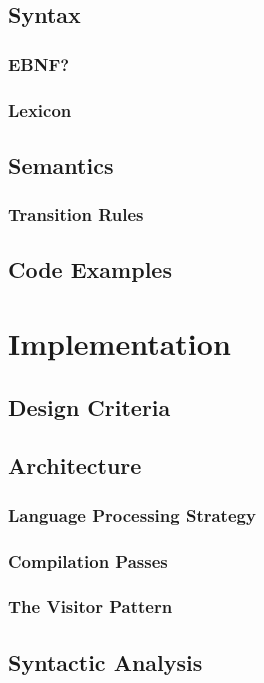 \section{Syntax}
\subsection{EBNF?}
\subsection{Lexicon}
\section{Semantics}
\subsection{Transition Rules}
\section{Code Examples}

\renewcommand{\ind}[1]{}
\chapter{Implementation}
\section{Design Criteria}
\section{Architecture}	
\ind{Hardware}
\ind{OverviewCompiler}
\subsection{Language Processing Strategy}
\subsection{Compilation Passes}
\ind{AbstractSyntaxTrees}
\subsection{The Visitor Pattern}
\section{Syntactic Analysis}
